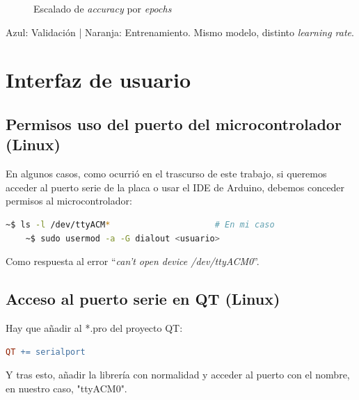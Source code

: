 \begin{appendices}
\begin{figure}[h]
    \centering
    \hfill
    \caption{Escalado de \textit{accuracy} por \textit{epochs}\label{lRate}}
\end{figure}
{\small {\color{cyan}Azul}: Validación | {\color{orange}Naranja}: Entrenamiento. Mismo modelo, distinto \textit{learning rate}.}

\chapter{Interfaz de usuario}
\section{Permisos uso del puerto del microcontrolador (Linux)\label{pserie}}
En algunos casos, como ocurrió en el trascurso de este trabajo,
si queremos acceder al puerto serie de la placa o usar el IDE de
Arduino, debemos conceder permisos al microcontrolador:
\begin{lstlisting}[language=bash]
    ~$ ls -l /dev/ttyACM*                     # En mi caso
    ~$ sudo usermod -a -G dialout <usuario>
\end{lstlisting}

Como respuesta al error ``\textit{can't open device /dev/ttyACM0}''.


\section{Acceso al puerto serie en QT (Linux)\label{psQT}}
Hay que añadir al *.pro del proyecto QT:
\begin{lstlisting}[language=make]
  QT += serialport
\end{lstlisting}
Y tras esto, añadir la librería con normalidad y acceder al puerto
con el nombre, en nuestro caso, "ttyACM0".


\end{appendices}
